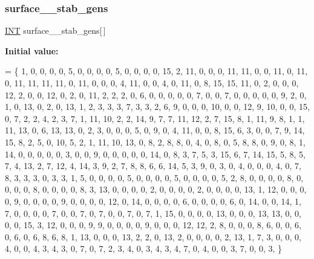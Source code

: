 \subsubsection{\texorpdfstring{surface\+\_\+\_\+stab\+\_\+gens}{surface\_16\_stab\_gens}}
{\footnotesize\ttfamily \mbox{\hyperlink{galois_8h_a09fddde158a3a20bd2dcadb609de11dc}{I\+NT}} surface\+\_\+\_\+stab\+\_\+gens\mbox{[}$\,$\mbox{]}}

{\bfseries Initial value\+:}
\begin{DoxyCode}
= \{
     1,  0,  0,  0,  0,  5,  0,  0,  0,  0,  5,  0,  0,  0,  0, 15, 2, 
    11,  0,  0,  0, 11, 11,  0,  0, 11,  0, 11,  0, 11, 11, 11, 11, 0, 
    11,  0,  0,  0,  4, 11,  0,  0,  4,  0, 11,  0,  8, 15, 15, 11, 0, 
     2,  0,  0,  0, 12,  2,  0,  0, 12,  0,  2,  0, 11,  2,  2,  2, 0, 
     6,  0,  0,  0,  0,  0,  7,  0,  0,  7,  0,  0,  0,  0,  0,  9, 2, 
     0,  1,  0, 13,  0,  2,  0, 13,  1,  2,  3,  3,  3,  7,  3,  3, 2, 
     6,  9,  0,  0,  0, 10,  0,  0, 12,  9, 10,  0,  0, 15,  0,  7, 2, 
     2,  4,  2,  3,  7,  1, 11, 10,  2,  2, 14,  9,  7,  7, 11, 12, 2, 
     7, 15,  8,  1, 11,  9,  8,  1,  1, 11, 13,  0,  6, 13, 13,  0, 2, 
     3,  0,  0,  0,  5,  0,  9,  0,  4, 11,  0,  0,  8, 15,  6,  3, 0, 
     0,  7,  9, 14, 15,  8,  2,  5,  0, 10,  5,  2,  1, 11, 10, 13, 0, 
     8,  2,  8,  8,  0,  4,  0,  8,  0,  5,  8,  8,  0,  9,  0,  8, 1, 
    14,  0,  0,  0,  0,  0,  3,  0,  0,  9,  0,  0,  0,  0,  0, 14, 0, 
     8,  3,  7,  5,  3, 15,  6,  7, 14, 15,  5,  8,  5,  7,  4, 13, 2, 
     7, 12,  4, 14,  3,  9,  2,  7,  8,  8,  6,  6, 14,  5,  3,  9, 0, 
     3,  0,  4,  0,  0,  0,  4,  0,  7,  8,  3,  3,  3,  0,  3,  3, 1, 
     5,  0,  0,  0,  0,  5,  0,  0,  0,  0,  5,  0,  0,  0,  0,  5, 2, 
     8,  0,  0,  0,  0,  8,  0,  0,  0,  0,  8,  0,  0,  0,  0,  8, 3, 
    13,  0,  0,  0,  0,  2,  0,  0,  0,  0,  2,  0,  0,  0,  0, 13, 1, 
    12,  0,  0,  0,  0,  9,  0,  0,  0,  0,  9,  0,  0,  0,  0, 12, 0, 
    14,  0,  0,  0,  0,  6,  0,  0,  0,  0,  6,  0, 14,  0,  0, 14, 1, 
     7,  0,  0,  0,  0,  7,  0,  0,  7,  0,  7,  0,  0,  7,  0,  7, 1, 
    15,  0,  0,  0,  0, 13,  0,  0,  0, 13, 13,  0,  0,  0,  0, 15, 3, 
    12,  0,  0,  0,  9,  9,  0,  0,  0,  0,  9,  0,  0,  0, 12, 12, 2, 
     8,  0,  0,  0,  8,  6,  0,  0,  6,  0,  6,  0,  6,  8,  6,  8, 1, 
    13,  0,  0,  0, 13,  2,  2,  0, 13,  2,  0,  0,  0,  0,  2, 13, 1, 
     7,  3,  0,  0,  0,  4,  0,  0,  4,  3,  4,  3,  0,  7,  0,  7, 2, 
     3,  4,  0,  3,  4,  3,  4,  7,  0,  4,  0,  0,  3,  7,  0,  0, 3, 
\}
\end{DoxyCode}
\mbox{\label{surface__16_8_c_ac76e08059f832e3c562ebb65ede46858}} 

